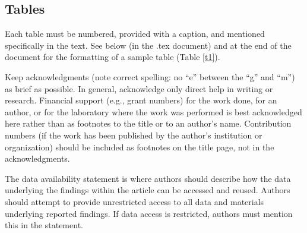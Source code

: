 \documentclass{ametsocV5}
\begin{document}
\subsection{Tables}
Each table must be numbered, provided with a caption, and mentioned
specifically in the text. 
See below (in the .tex document) and at the end of the document for the formatting of a sample table (Table \ref{t1}).


\acknowledgments
Keep acknowledgments (note correct spelling: no ``e'' between the ``g'' and
``m'') as brief as possible. In general, acknowledge only direct help in
writing or research. Financial support (e.g., grant numbers) for the work
done, for an author, or for the laboratory where the work was performed is
best acknowledged here rather than as footnotes to the title or to an
author's name. Contribution numbers (if the work has been published by the
author's institution or organization) should be included as footnotes on the title page,
not in the acknowledgments.

% 
%
\datastatement
The data availability statement is where authors should describe how the data underlying 
the findings within the article can be accessed and reused. Authors should attempt to 
provide unrestricted access to all data and materials underlying reported findings. 
If data access is restricted, authors must mention this in the statement.
\end{document}
